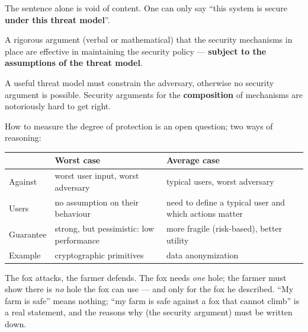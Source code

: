 \begin{warnbox}[title={``This system is secure'' means nothing}]
The sentence alone is void of content. One can only say ``this system is secure \textbf{under
this threat model}''.
\end{warnbox}

\begin{defnbox}[title=Security argument]
A rigorous argument (verbal or mathematical) that the security mechanisms in place are
effective in maintaining the security policy — \textbf{subject to the assumptions of
the threat model}.
\end{defnbox}

\begin{warnbox}[title=Composition is hard]
A useful threat model must constrain the adversary, otherwise no security argument is
possible. Security arguments for the \textbf{composition} of mechanisms are notoriously
hard to get right.
\end{warnbox}

\begin{defnbox}[title={How secure? Worst case vs.\ average case}]
How to measure the degree of protection is an open question; two ways of reasoning:
\begin{center}
\begin{tabularx}{\linewidth}{@{}l X X@{}}
\toprule
 & \textbf{Worst case} & \textbf{Average case} \\
\midrule
Against   & worst user input, worst adversary & typical users, worst adversary \\
Users     & no assumption on their behaviour & need to define a typical user and which actions matter \\
Guarantee & strong, but pessimistic: low performance & more fragile (risk-based), better utility \\
Example   & cryptographic primitives & data anonymization \\
\bottomrule
\end{tabularx}
\end{center}
\end{defnbox}

\begin{goatbox}
The fox attacks, the farmer defends. The fox needs \emph{one} hole; the farmer must show there
is \emph{no} hole the fox can use --- and only for the fox he described. ``My farm is safe'' means
nothing; ``my farm is safe against a fox that cannot climb'' is a real statement, and the reasons
why (the security argument) must be written down.
\end{goatbox}


